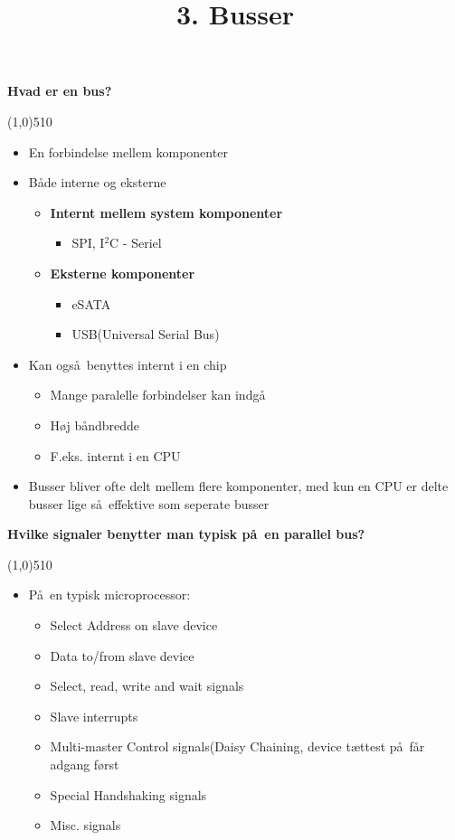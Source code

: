 \documentclass{paper}
\title{3. Busser}
\begin{document}
\maketitle
\begin{large}\textbf{Hvad er en bus?}\end{large}

\line(1,0){510}
\begin{itemize}
	\item En forbindelse mellem komponenter
	\item B\aa de interne og eksterne
	\begin{itemize}
		\item \textbf{Internt mellem system komponenter}
		\begin{itemize}
						\item SPI, I$^{2}$C - Seriel
		\end{itemize}
		\item \textbf{Eksterne komponenter}
		\begin{itemize}
			\item eSATA
			\item USB(Universal Serial Bus)
		\end{itemize}
	\end{itemize}	
	\item Kan ogs\aa\ benyttes internt i en chip
	\begin{itemize}
		\item Mange paralelle forbindelser kan indg\aa\
		\item H\o j b\aa ndbredde
		\item F.eks. internt i en CPU
	\end{itemize}
	\item Busser bliver ofte delt mellem flere komponenter, med kun en CPU er delte busser lige s\aa\ effektive som seperate busser
\end{itemize}

\begin{large}\textbf{Hvilke signaler benytter man typisk p\aa\ en parallel bus?}\end{large}

\line(1,0){510}
\begin{itemize}
	\item P\aa\ en typisk microprocessor:
	\begin{itemize}
		\item Select Address on slave device
		\item Data to/from slave device
		\item Select, read, write and wait signals
		\item Slave interrupts
		\item Multi-master Control signals(Daisy Chaining, device t\ae ttest p\aa\ f\aa r adgang f\o rst
		\item Special Handshaking signals
		\item Misc. signals	
	\end{itemize}
\end{itemize}
\end{document}
